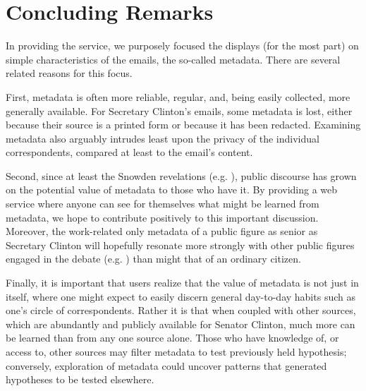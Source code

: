 \documentclass[journal]{vgtc}                %
\begin{document}
\section{Concluding Remarks}
In providing the service, we purposely focused the displays (for the most part) on simple characteristics of the emails, the so-called metadata.  There are several related reasons for this focus.  

First, metadata is often more reliable, regular, and, being easily collected, more generally available.  For Secretary Clinton's emails,  some metadata is lost, either because their source is a printed form or because it has been redacted.  Examining metadata also arguably intrudes least upon the privacy of the individual correspondents, compared at least to the email's content.  

Second, since at least the Snowden revelations (e.g. \cite{NYRsnowdenLeaks}), public discourse has grown on the potential value of metadata to those who have it.  By providing a web service where anyone can see for themselves what might be learned from metadata, we hope to contribute positively to this important discussion.  Moreover, the work-related only metadata of a public figure as senior as Secretary Clinton will hopefully resonate more strongly with other public figures  engaged in the debate (e.g.   \cite{NYRmetadata, ObamaMetadata, JebBushMetadata2015, PompeoMetadata, TrumpMetadata}) than might that of an ordinary citizen.  

Finally, it is important that users realize that the value of metadata is not just in itself, where one might expect to easily discern general day-to-day habits such as one's circle of correspondents.  Rather it is that when coupled with other sources, which are abundantly and publicly available for Senator Clinton, much more can be learned than from any one source alone.  Those who have knowledge of, or access to, other sources may filter metadata to test previously held hypothesis; conversely, exploration of metadata could uncover patterns that generated hypotheses to be tested elsewhere. 


\newpage
$~~~$
\newpage


%
%
%
%


\end{document}
